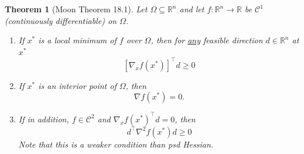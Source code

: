 \documentclass{article}
\newtheorem{theorem}{Theorem}[section]
\begin{document}
	\begin{theorem}[Moon Theorem 18.1]
		Let $\Omega \subseteq \mathbb{R}^n$ and let $f:\mathbb{R}^n\to\mathbb{R}$ be $\mathcal{C}^1$ (continuously differentiable) on $\Omega$.
		
		\begin{enumerate}
		\item If $x^{\ast}$ is a local minimum of $f$ over $\Omega$, then for \underline{any} feasible direction $d \in \mathbb{R}^n$ at $x^{\ast}$
			\[ 
				\left[ \nabla_xf(x^{\ast}) \right]^\top d \geq 0 
			\]
		\item If $x^{\ast}$ is an interior point of $\Omega$, then 
			\[ 
				\nabla f(x^{\ast}) = 0.
			\]
		\item If in addition, $f \in \mathcal{C}^2$ and $\nabla_x f(x^{\ast})^\top d = 0$, then 
			\[ 
				d^\top \nabla^2f(x^{\ast})d \geq 0 
			\]
			Note that this is a weaker condition than psd Hessian.
		\end{enumerate}		
	\end{theorem}
\end{document}
